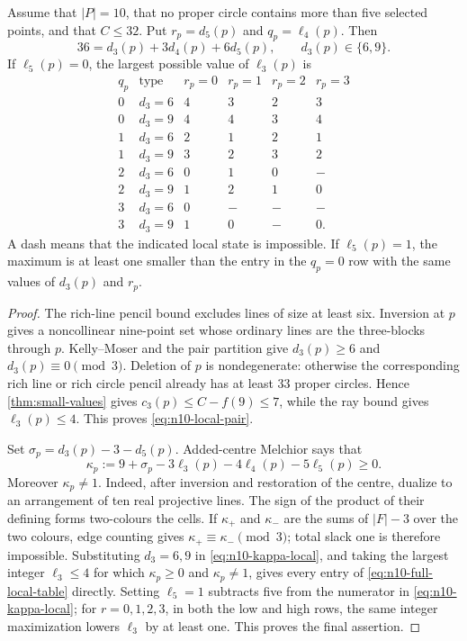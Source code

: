 \begin{lemma}\label{lem:n10-local-parity}
Assume that $|P|=10$, that no proper circle contains more than five selected
points, and that $C\le32$.  Put $r_p=d_5(p)$ and $q_p=\ell_4(p)$.  Then
\begin{equation}\label{eq:n10-local-pair}
 36=d_3(p)+3d_4(p)+6d_5(p),\qquad d_3(p)\in\{6,9\}.
\end{equation}
If $\ell_5(p)=0$, the largest possible value of $\ell_3(p)$ is
\begin{equation}
\begin{array}{c|c|rrrr}
q_p&\text{type}&r_p=0&r_p=1&r_p=2&r_p=3\\ \hline
0&d_3=6&4&3&2&3\\
0&d_3=9&4&4&3&4\\
1&d_3=6&2&1&2&1\\
1&d_3=9&3&2&3&2\\
2&d_3=6&0&1&0&-\\
2&d_3=9&1&2&1&0\\
3&d_3=6&0&-&-&-\\
3&d_3=9&1&0&-&0.
\end{array}\label{eq:n10-full-local-table}
\end{equation}
A dash means that the indicated local state is impossible.  If
\(\ell_5(p)=1\), the maximum is at least one smaller than the entry in the
\(q_p=0\) row with the same values of \(d_3(p)\) and \(r_p\).
\end{lemma}

\begin{proof}
The rich-line pencil bound excludes lines of size at least six.  Inversion
at $p$ gives a noncollinear nine-point set whose ordinary lines are the
three-blocks through $p$.  Kelly--Moser and the pair partition give
$d_3(p)\ge6$ and $d_3(p)\equiv0\pmod3$.  Deletion of $p$ is nondegenerate:
otherwise the corresponding rich line or rich circle pencil already has at
least $33$ proper circles.  Hence \cref{thm:small-values} gives
$c_3(p)\le C-f(9)\le7$, while the ray bound gives $\ell_3(p)\le4$.
This proves \eqref{eq:n10-local-pair}.

Set $\sigma_p=d_3(p)-3-d_5(p)$.  Added-centre Melchior says that
\begin{equation}\label{eq:n10-kappa-local}
 \kappa_p:=9+\sigma_p-3\ell_3(p)-4\ell_4(p)-5\ell_5(p)\ge0.
\end{equation}
Moreover $\kappa_p\ne1$.  Indeed, after inversion and restoration of the
centre, dualize to an arrangement of ten real projective lines.  The sign
of the product of their defining forms two-colours the cells.  If
$\kappa_+$ and $\kappa_-$ are the sums of $|F|-3$ over the two colours,
edge counting gives $\kappa_+\equiv\kappa_-\pmod3$; total slack one is
therefore impossible.  Substituting $d_3=6,9$ in
\eqref{eq:n10-kappa-local}, and taking the largest integer
$\ell_3\le4$ for which $\kappa_p\ge0$ and $\kappa_p\ne1$, gives every entry
of \eqref{eq:n10-full-local-table} directly.  Setting \(\ell_5=1\) subtracts
five from the numerator in \eqref{eq:n10-kappa-local}; for
\(r=0,1,2,3\), in both the low and high rows, the same integer maximization
lowers \(\ell_3\) by at least one.  This proves the final assertion.
\end{proof}

